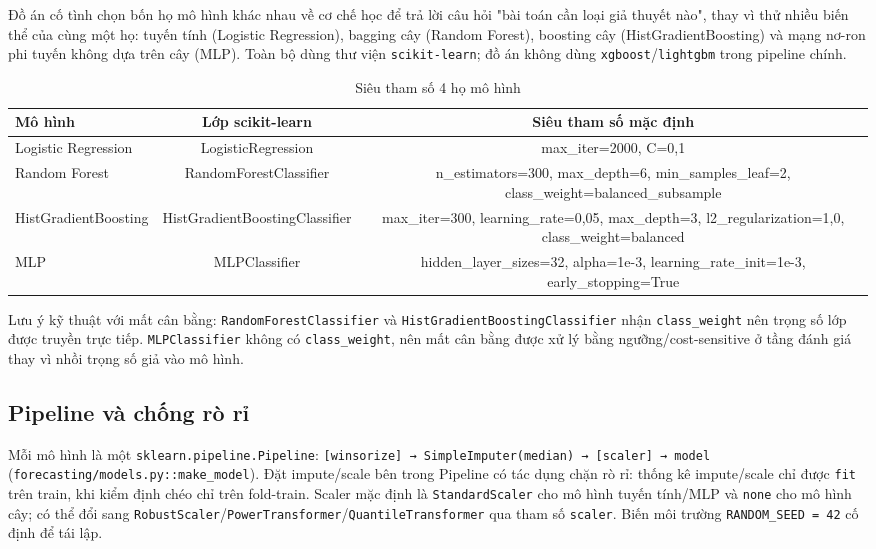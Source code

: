 \documentclass[13pt,a4paper]{extreport}
\begin{document}
Đồ án cố tình chọn bốn họ mô hình khác nhau về cơ chế học để trả lời câu hỏi "bài toán cần loại giả thuyết nào", thay vì thử nhiều biến thể của cùng một họ: tuyến tính (Logistic Regression), bagging cây (Random Forest), boosting cây (HistGradientBoosting) và mạng nơ-ron phi tuyến không dựa trên cây (MLP). Toàn bộ dùng thư viện \texttt{scikit-learn}; đồ án không dùng \texttt{xgboost}/\texttt{lightgbm} trong pipeline chính.

\begin{table}[H]
\centering
\caption{Siêu tham số 4 họ mô hình}
\begin{center}
\small
\begin{tabular}{|l|c|c|}
\hline
\textbf{Mô hình} & \textbf{Lớp scikit-learn} & \textbf{Siêu tham số mặc định} \\ \hline
Logistic Regression & LogisticRegression & max\_iter=2000, C=0,1 \\ \hline
Random Forest & RandomForestClassifier & n\_estimators=300, max\_depth=6, min\_samples\_leaf=2, class\_weight=balanced\_subsample \\ \hline
HistGradientBoosting & HistGradientBoostingClassifier & max\_iter=300, learning\_rate=0,05, max\_depth=3, l2\_regularization=1,0, class\_weight=balanced \\ \hline
MLP & MLPClassifier & hidden\_layer\_sizes=32, alpha=1e-3, learning\_rate\_init=1e-3, early\_stopping=True \\ \hline
\end{tabular}
\end{center}
\end{table}

Lưu ý kỹ thuật với mất cân bằng: \texttt{RandomForestClassifier} và \texttt{HistGradientBoostingClassifier} nhận \texttt{class\_weight} nên trọng số lớp được truyền trực tiếp. \texttt{MLPClassifier} không có \texttt{class\_weight}, nên mất cân bằng được xử lý bằng ngưỡng/cost-sensitive ở tầng đánh giá thay vì nhồi trọng số giả vào mô hình.

\subsection{Pipeline và chống rò rỉ}

Mỗi mô hình là một \texttt{sklearn.pipeline.Pipeline}: \texttt{[winsorize] → SimpleImputer(median) → [scaler] → model} (\texttt{forecasting/models.py::make\_model}). Đặt impute/scale bên trong Pipeline có tác dụng chặn rò rỉ: thống kê impute/scale chỉ được \texttt{fit} trên train, khi kiểm định chéo chỉ trên fold-train. Scaler mặc định là \texttt{StandardScaler} cho mô hình tuyến tính/MLP và \texttt{none} cho mô hình cây; có thể đổi sang \texttt{RobustScaler}/\texttt{PowerTransformer}/\texttt{QuantileTransformer} qua tham số \texttt{scaler}. Biến môi trường \texttt{RANDOM\_SEED = 42} cố định để tái lập.
\end{document}
